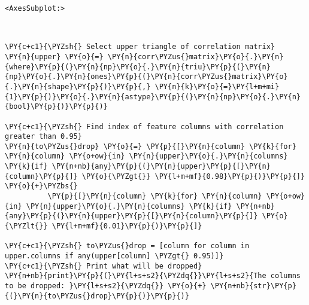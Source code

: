 \begin{tcolorbox}[breakable, size=fbox, boxrule=.5pt, pad at break*=1mm, opacityfill=0]
\begin{Verbatim}[commandchars=\\\{\}]
<AxesSubplot:>
\end{Verbatim}
\end{tcolorbox}
    \begin{center}
    \end{center}
    { \hspace*{\fill} \\}
    
 \lipsum[1-1]

\newpage


\begin{tcolorbox}[breakable, size=fbox, boxrule=1pt, pad at break*=1mm,colback=cellbackground, colframe=cellborder]
\begin{Verbatim}[commandchars=\\\{\}]
\PY{c+c1}{\PYZsh{} Select upper triangle of correlation matrix}
\PY{n}{upper} \PY{o}{=} \PY{n}{corr\PYZus{}matrix}\PY{o}{.}\PY{n}{where}\PY{p}{(}\PY{n}{np}\PY{o}{.}\PY{n}{triu}\PY{p}{(}\PY{n}{np}\PY{o}{.}\PY{n}{ones}\PY{p}{(}\PY{n}{corr\PYZus{}matrix}\PY{o}{.}\PY{n}{shape}\PY{p}{)}\PY{p}{,} \PY{n}{k}\PY{o}{=}\PY{l+m+mi}{1}\PY{p}{)}\PY{o}{.}\PY{n}{astype}\PY{p}{(}\PY{n}{np}\PY{o}{.}\PY{n}{bool}\PY{p}{)}\PY{p}{)}

\PY{c+c1}{\PYZsh{} Find index of feature columns with correlation greater than 0.95}
\PY{n}{to\PYZus{}drop} \PY{o}{=} \PY{p}{[}\PY{n}{column} \PY{k}{for} \PY{n}{column} \PY{o+ow}{in} \PY{n}{upper}\PY{o}{.}\PY{n}{columns} \PY{k}{if} \PY{n+nb}{any}\PY{p}{(}\PY{n}{upper}\PY{p}{[}\PY{n}{column}\PY{p}{]} \PY{o}{\PYZgt{}} \PY{l+m+mf}{0.98}\PY{p}{)}\PY{p}{]} \PY{o}{+}\PYZbs{}
          \PY{p}{[}\PY{n}{column} \PY{k}{for} \PY{n}{column} \PY{o+ow}{in} \PY{n}{upper}\PY{o}{.}\PY{n}{columns} \PY{k}{if} \PY{n+nb}{any}\PY{p}{(}\PY{n}{upper}\PY{p}{[}\PY{n}{column}\PY{p}{]} \PY{o}{\PYZlt{}} \PY{l+m+mf}{0.01}\PY{p}{)}\PY{p}{]}

\PY{c+c1}{\PYZsh{} to\PYZus{}drop = [column for column in upper.columns if any(upper[column] \PYZgt{} 0.95)]}
\PY{c+c1}{\PYZsh{} Print what will be dropped}
\PY{n+nb}{print}\PY{p}{(}\PY{l+s+s2}{\PYZdq{}}\PY{l+s+s2}{The columns to be dropped: }\PY{l+s+s2}{\PYZdq{}} \PY{o}{+} \PY{n+nb}{str}\PY{p}{(}\PY{n}{to\PYZus{}drop}\PY{p}{)}\PY{p}{)}
\end{Verbatim}
\end{tcolorbox}


